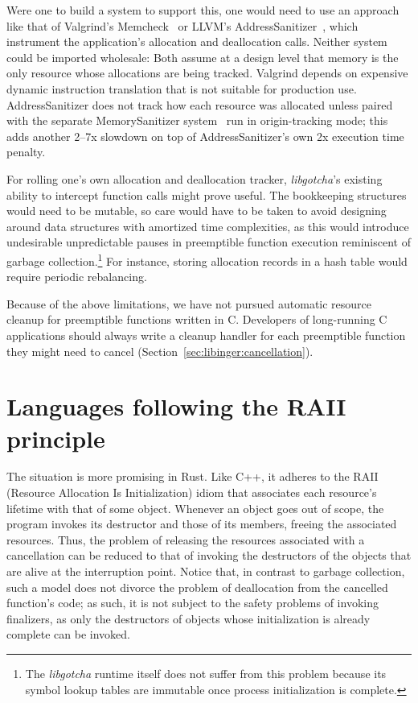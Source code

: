 Were one to build a system to support this, one would need to use an approach like
that of Valgrind's Memcheck~\cite{seward:usenix2005} or LLVM's
AddressSanitizer~\cite{serebryany:usenix2012}, which
instrument the application's allocation and deallocation calls.  Neither system could
be imported wholesale:  Both assume at a design level that memory is the only
resource whose allocations are being tracked.  Valgrind depends on expensive dynamic
instruction translation that is not suitable for production use.  AddressSanitizer
does not track how each resource was allocated unless paired with the separate
MemorySanitizer system~\cite{stepanov:cgo2015} run in origin-tracking mode; this adds
another 2--7x slowdown on top of AddressSanitizer's own 2x execution time penalty.

For rolling one's own allocation and deallocation tracker, \textit{libgotcha}'s
existing ability to intercept function calls might prove useful.  The bookkeeping
structures would need to be mutable, so care would have to be taken to avoid
designing around data structures with
amortized time complexities, as this would introduce undesirable unpredictable pauses
in preemptible function execution reminiscent of garbage collection.\footnote{The
\textit{libgotcha} runtime itself does not suffer from this problem because its
symbol lookup tables are immutable once process initialization is complete.}  For
instance, storing allocation records in a hash table would require periodic
rebalancing.

Because of the above limitations, we have not pursued automatic resource cleanup for
preemptible functions written in C.  Developers of long-running C applications should
always write a cleanup handler for each preemptible function they might need to
cancel (Section~\ref{sec:libinger:cancellation}).


\section{Languages following the RAII principle}
\label{sec:ingerc:raii}

The situation is more promising in Rust.  Like C++, it adheres to the RAII (Resource
Allocation Is Initialization) idiom that associates each resource's lifetime with
that of some object.  Whenever an object goes out of scope, the program invokes its
destructor and those of its members, freeing the associated resources.  Thus, the
problem of releasing the resources associated with a cancellation can be reduced to
that of invoking the destructors of the objects that are alive at the interruption
point.  Notice that, in contrast to garbage collection, such a model does not divorce
the problem of deallocation from the cancelled function's code; as such, it is not
subject to the safety problems of invoking finalizers, as only the destructors of
objects whose initialization is already complete can be invoked.


